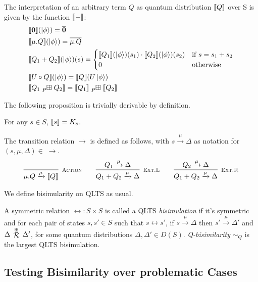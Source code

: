 The interpretation of an arbitrary term $Q$ as quantum distribution $\llbracket Q\rrbracket$ over S is given by the function $\llbracket{-}\rrbracket$:
\begin{align*}
	&\sem{\nil}(\ket{\phi}) = \overline{\nil}\\
	&\sem{\mu.Q}(\ket{\phi}) = \overline{\mu.Q}\\
	&\sem{Q_1 + Q_2}(\ket{\phi})(s) = 
	\begin{cases}
		\sem{Q_1}(\ket{\phi})(s_1) \cdot \sem{Q_2}(\ket{\phi})(s_2) & \text{if } s = s_1 + s_2\\
		0 & \text{otherwise}
	\end{cases}\\
	&\sem{U \circ Q}(\ket{\phi}) = \sem{Q}(U \ket{\phi})\\
	&\sem{Q_1 \qsum{P} Q_2} = \sem{Q_1} \qsum{P} \sem{Q_2}
\end{align*}

The following proposition is trivially derivable by definition.
\begin{proposition}
	For any $s \in S$, $\llbracket s\rrbracket = K_{\overline{s}}$.
\end{proposition}

The transition relation $\to$ is defined as follows, with $s \xrightarrow{\mu} \Delta$ as notation for $(s, \mu, \Delta) \in\;\to$.
\begin{gather*}
  \infer[\mbox{\footnotesize\scshape Action}]{\mu.Q \xrightarrow{\mu} \sem{Q}}{} \qquad 
  \infer[\mbox{\footnotesize\scshape Ext.L}]{Q_1 + Q_2 \xrightarrow{\mu} \Delta}{Q_1 \xrightarrow{\mu} \Delta} \qquad
  \infer[\mbox{\footnotesize\scshape Ext.R}]{Q_1 + Q_2 \xrightarrow{\mu} \Delta}{Q_2 \xrightarrow{\mu} \Delta}
\end{gather*}

We define bisimularity on QLTS as usual.
\begin{definition}
	A symmetric relation $\rel : S \times S$ is called a QLTS \emph{bisimulation} if it's symmetric and for each pair of states $s, s' \in S$ such that $s \rel s'$,
	if $s \xrightarrow{\mu} \Delta$ then $s' \xrightarrow{\mu} \Delta'$ and $\Delta\,\stackrel{\scriptscriptstyle \boxplus}{\mathcal{R}}\,\Delta'$, for some quantum distributions $\Delta, \Delta' \in D(S)$.
	\emph{Q-bisimilarity} $\sim_Q$ is the largest QLTS bisimulation.
\end{definition}


\subsection{Testing Bisimilarity over problematic Cases}

